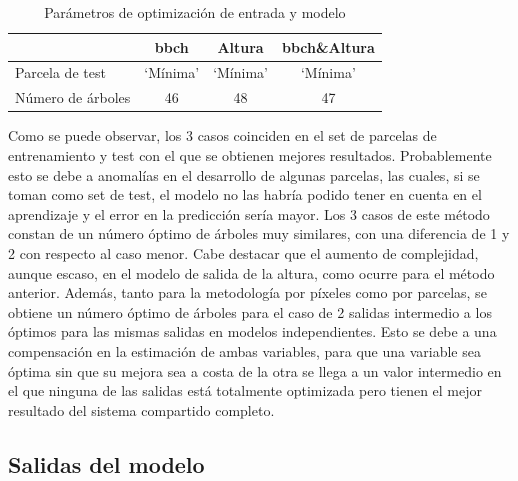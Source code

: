 \begin{table}[h]
\centering
\begin{tabular}{l|ccc}
                  & \gls{bbch}     & Altura   & \gls{bbch}\&Altura \\ \hline
Parcela de test   & `Mínima' & `Mínima' & `Mínima'     \\
Número de árboles & 46       & 48       & 47          
\end{tabular}
\caption{Parámetros de optimización de entrada y modelo \label{tab:opt_pixl}}
\end{table}

\par Como se puede observar, los 3 casos coinciden en el set de parcelas de entrenamiento y test con el que se obtienen mejores resultados. Probablemente esto se debe a anomalías en el desarrollo de algunas parcelas, las cuales, si se toman como set de test, el modelo no las habría podido tener en cuenta en el aprendizaje y el error en la predicción sería mayor. Los 3 casos de este método constan de un número óptimo de árboles muy similares, con una diferencia de 1 y 2 con respecto al caso menor. Cabe destacar que el aumento de complejidad, aunque escaso, en el modelo de salida de la altura, como ocurre para el método anterior. Además, tanto para la metodología por píxeles como por parcelas, se obtiene un número óptimo de árboles para el caso de 2 salidas intermedio a los óptimos para las mismas salidas en modelos independientes. Esto se debe a una compensación en la estimación de ambas variables, para que una variable sea óptima sin que su mejora sea a costa de la otra se llega a un valor intermedio en el que ninguna de las salidas está totalmente optimizada pero tienen el mejor resultado del sistema compartido completo. 


\subsection{Salidas del modelo}
